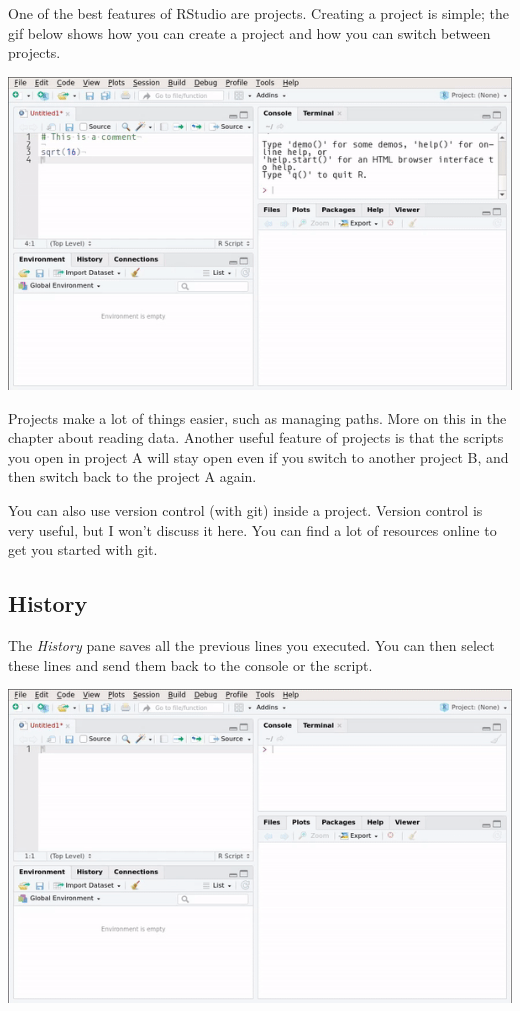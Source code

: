 \documentclass[]{gitbook}
\theoremstyle{definition}
\theoremstyle{definition}
\theoremstyle{definition}
\theoremstyle{remark}
\begin{document}
One of the best features of RStudio are projects. Creating a project is
simple; the gif below shows how you can create a project and how you can
switch between projects.

\includegraphics{pics/rstudio_projects.gif}

Projects make a lot of things easier, such as managing paths. More on
this in the chapter about reading data. Another useful feature of
projects is that the scripts you open in project A will stay open even
if you switch to another project B, and then switch back to the project
A again.

You can also use version control (with git) inside a project. Version
control is very useful, but I won't discuss it here. You can find a lot
of resources online to get you started with git.

\hypertarget{history}{%
\subsection{History}\label{history}}

The \emph{History} pane saves all the previous lines you executed. You
can then select these lines and send them back to the console or the
script.

\includegraphics{pics/rstudio_history.gif}
\end{document}
